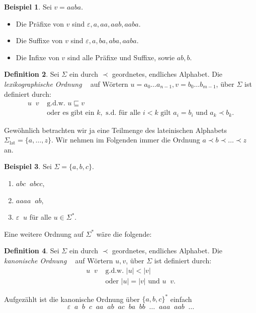 \documentclass[11pt, a4paper]{article}
\theoremstyle{definition}
\newtheorem{definition}{Definition}[section]
\newtheorem{example}[definition]{Beispiel}
\theoremstyle{plain}
\numberwithin{equation}{section}
\DeclareMathOperator{\lex}{\prec_\text{lex}}
\DeclareMathOperator{\canon}{\prec_\text{cn}}
\begin{document}
\begin{example}
	Sei $v = aaba$.
	\begin{itemize}
		\item Die Präfixe von $v$ sind $\varepsilon, a, aa, aab, aaba$.
		\item Die Suffixe von $v$ sind $\varepsilon, a, ba, aba, aaba$.
		\item Die Infixe von $v$ sind alle Präfixe und Suffixe, sowie $ab, b$.
	\end{itemize}
\end{example}
\begin{definition}
	Sei $\Sigma$ ein durch $\prec$ geordnetes, endliches Alphabet. Die \textit{lexikographische Ordnung} $\lex$ auf Wörtern $u = a_0 \ldots a_{n-1}, v = b_0 \ldots b_{m-1}$, über $\Sigma$ ist definiert durch:
	\begin{align*}
		u \lex v &\text{ g.d.w. } u \sqsubseteq v\\
		& \text{ oder es gibt ein } k, \text{ s.d. für alle } i < k \text{ gilt } a_i = b_i \text{ und } a_k \prec b_k.
	\end{align*}
\end{definition}
Gewöhnlich betrachten wir ja eine Teilmenge des lateinischen Alphabets $\Sigma_\text{lat} = \{a, \ldots, z\}$. Wir nehmen im Folgenden immer die Ordnung $a \prec b \prec \ldots \prec z$ an.
\begin{example}
	Sei $\Sigma = \{a, b, c\}$.
	\begin{enumerate}[label=\arabic*)]
		\item $abc \lex abcc$,
		\item $aaaa \lex ab$,
		\item $\varepsilon \lex u$ für alle $u \in \Sigma^\ast$.
	\end{enumerate}
\end{example}
Eine weitere Ordnung auf $\Sigma^\ast$ wäre die folgende:
\begin{definition}
	Sei $\Sigma$ ein durch $\prec$ geordnetes, endliches Alphabet. Die \textit{kanonische Ordnung} $\canon$ auf Wörtern $u, v$, über $\Sigma$ ist definiert durch:
	\begin{align*}
		u \canon v &\text{ g.d.w. } |u| < |v|\\
		&\text{ oder } |u| = |v| \text{ und } u \lex v.
	\end{align*}
\end{definition}
Aufgezählt ist die kanonische Ordnung über $\{a, b, c\}^\ast$ einfach
$$
	\varepsilon \canon a \canon b \canon c \canon aa \canon ab \canon ac \canon ba \canon bb \canon \ldots \canon aaa \canon aab \canon \ldots	
$$
\end{document}
